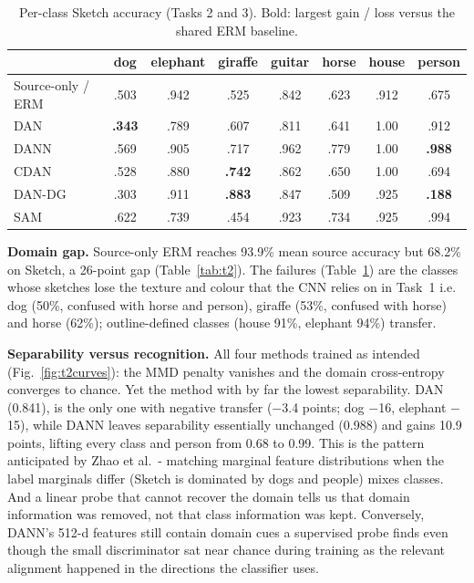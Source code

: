 \documentclass{article}
\begin{document}
\begin{table}[t]
\centering\small
\caption{Per-class Sketch accuracy (Tasks 2 and 3). Bold: largest gain / loss versus the shared ERM baseline.}
\label{tab:perclass}
\setlength{\tabcolsep}{5pt}
\begin{tabular}{@{}lccccccc@{}}
\toprule
& dog & elephant & giraffe & guitar & horse & house & person \\
\midrule
Source-only / ERM & .503 & .942 & .525 & .842 & .623 & .912 & .675 \\
DAN & \textbf{.343} & .789 & .607 & .811 & .641 & 1.00 & .912 \\
DANN & .569 & .905 & .717 & .962 & .779 & 1.00 & \textbf{.988} \\
CDAN & .528 & .880 & \textbf{.742} & .862 & .650 & 1.00 & .694 \\
\midrule
DAN-DG & .303 & .911 & \textbf{.883} & .847 & .509 & .925 & \textbf{.188} \\
SAM & .622 & .739 & .454 & .923 & .734 & .925 & .994 \\
\bottomrule
\end{tabular}
\end{table}



\textbf{Domain gap.} Source-only ERM reaches 93.9\% mean source accuracy but 68.2\% on Sketch, a 26-point gap (Table~\ref{tab:t2}). The failures (Table~\ref{tab:perclass}) are the classes whose sketches lose the texture and colour that the CNN relies on in Task~1 i.e. dog (50\%, confused with horse and person), giraffe (53\%, confused with horse) and horse (62\%); outline-defined classes (house 91\%, elephant 94\%) transfer.

\textbf{Separability versus recognition.} All four methods trained as intended (Fig.~\ref{fig:t2curves}): the MMD penalty vanishes and the domain cross-entropy converges to chance. Yet the method with by far the lowest separability. DAN (0.841), is the only one with negative transfer ($-$3.4 points; dog $-$16, elephant $-$15), while DANN leaves separability essentially unchanged (0.988) and gains 10.9 points, lifting every class and person from 0.68 to 0.99. This
is the pattern anticipated by Zhao et al.~\cite{zhao2019invariant}- matching marginal feature distributions when the label marginals differ (Sketch is dominated by dogs and people) mixes classes. And a linear probe that cannot recover the domain tells us that domain information was removed, not that class information was kept. Conversely, DANN's 512-d features still contain domain cues a supervised probe finds even though the small discriminator sat near chance during
training as the relevant alignment happened in the directions the classifier uses.
\end{document}
